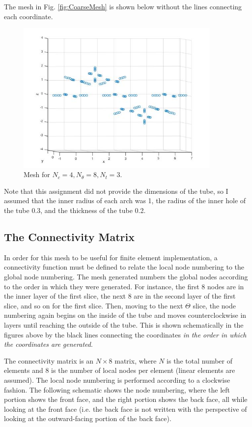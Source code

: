 \documentclass[10pt]{article}
\begin{document}
The mesh in Fig. \ref{fig:CoarseMesh} is shown below without the lines connecting each coordinate.

\begin{figure}[H]
  \centering
  \includegraphics[width=10cm]{CoarseMeshNoLines.jpg}
  \caption{Mesh for \(N_c=4, N_\theta=8, N_t=3\).}
\end{figure}

Note that this assignment did not provide the dimensions of the tube, so I assumed that the inner radius of each arch was 1, the radius of the inner hole of the tube 0.3, and the thickness of the tube 0.2.

\subsection{The Connectivity Matrix}

In order for this mesh to be useful for finite element implementation, a connectivity function must be defined to relate the local node numbering to the global node numbering. The mesh generated numbers the global nodes according to the order in which they were generated. For instance, the first 8 nodes are in the inner layer of the first slice, the next 8 are in the second layer of the first slice, and so on for the first slice. Then, moving to the next \(\Theta\) slice, the node numbering again begins on the inside of the tube and moves counterclockwise in layers until reaching the outside of the tube. This is shown schematically in the figures above by the black lines connecting the coordinates \textit{in the order in which the coordinates are generated}.

The connectivity matrix is an \(N\times8\) matrix, where \(N\) is the total number of elements and 8 is the number of local nodes per element (linear elements are assumed). The local node numbering is performed according to a clockwise fashion. The following schematic shows the node numbering, where the left portion shows the front face, and the right portion shows the back face, all while looking at the front face (i.e. the back face is not written with the perspective of looking at the outward-facing portion of the back face).
\end{document}
